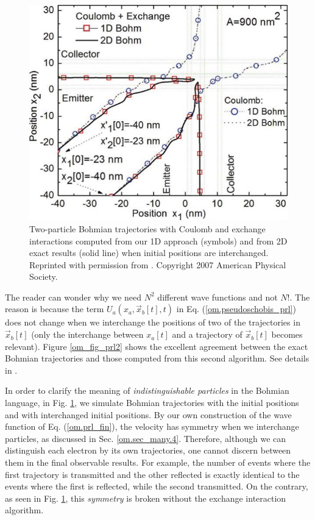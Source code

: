 \documentclass[onecolumn,nofootinbib, secnumarabic, amsmath, nobibnotes,12pt,aps,pra]{revtex4-1}
\newcommand{\fref}[1]{Fig. \ref{#1}}
\newcommand{\sref}[1]{Sec. \ref{#1}}
\newcommand{\eref}[1]{Eq. (\ref{#1})}
\newcommand{\Fref}[1]{Figure \ref{#1}}
\begin{document}
\begin{figure}
\includegraphics{ch1-08.pdf}
\caption{Two-particle Bohmian trajectories with Coulomb and exchange interactions computed from
our 1D approach (symbols) and from 2D exact results (solid line)
when initial positions are interchanged. Reprinted with permission
from \cite{om.oriolsprl}. Copyright 2007 American Physical Society.
} \label{om_fig_prl3}
\end{figure}

The reader can wonder why we need $N^2$ different wave functions and not $N!$. The reason is because the term \textit{$U_{a}(x_{a},\vec x_{b}[t],t)$} in \eref{om.pseudoschobis_prl} does not change when we interchange the positions of two of the trajectories in $\vec x_{b}[t]$ (only the interchange between $x_a[t]$ and a trajectory of $\vec x_{b}[t]$ becomes relevant). \Fref{om_fig_prl2} shows the excellent agreement between the exact Bohmian trajectories and those computed from this second algorithm. See details in \cite{om.oriolsprl}.

In order to clarify the meaning of \textit{indistinguishable
particles} in the Bohmian language, in \fref{om_fig_prl3},
we  simulate Bohmian trajectories with the
initial positions and with interchanged initial positions. By our
own construction of the wave function of \eref{om.prl_fin}, the
velocity has symmetry when we interchange particles, as discussed in
\sref{om.sec_many.4}. Therefore, although we can distinguish each
electron by its own trajectories, one cannot discern between them in
the final observable results. For example, the number of events
where the first trajectory is transmitted and the other reflected is
exactly identical to the events where the first is reflected, while
the second transmitted. On the contrary, as seen in
\fref{om_fig_prl3}, this \textit{symmetry} is broken without the
exchange interaction algorithm.
\end{document}
